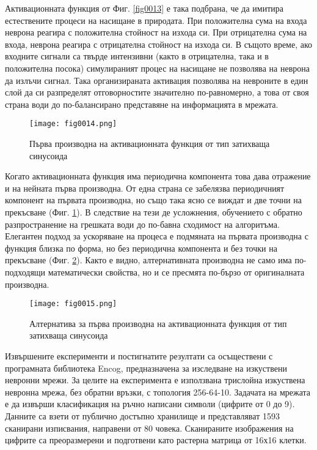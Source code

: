 Активационната функция от Фиг. \ref{fig0013} е така подбрана, че да имитира естествените процеси на насищане в природата. При положителна сума на входа неврона реагира с положителна стойност на изхода си. При отрицателна сума на входа, неврона реагира с отрицателна стойност на изхода си. В същото време, ако входните сигнали са твърде интензивни (както в отрицателна, така и в положителна посока) симулираният процес на насищане не позволява на неврона да излъчи сигнал. Така организираната активация позволява на невроните в един слой да си разпределят отговорностите значително по-равномерно, а това от своя страна води до по-балансирано представяне на информацията в мрежата.

\begin{figure}[H]
  \centering
  \texttt{[image: fig0014.png]}
  \caption{Първа производна на активационната функция от тип затихваща синусоида}
\label{fig0014}
\end{figure}

Когато активационната функция има периодична компонента това дава отражение и на нейната първа производна. От една страна се забелязва периодичният компонент на първата производна, но също така ясно се виждат и две точни на прекъсване (Фиг. \ref{fig0014}). В следствие на тези де усложнения, обучението с обратно разпространение на грешката води до по-бавна сходимост на алгоритъма. Елегантен подход за ускоряване на процеса е подмяната на първата производна с функция близка по форма, но без периодична компонента и без точки на прекъсване (Фиг. \ref{fig0015}). Както е видно, алтернативната производна не само има по-подходящи математически свойства, но и се пресмята по-бързо от оригиналната производна.

\begin{figure}[H]
  \centering
  \texttt{[image: fig0015.png]}
  \caption{Алтернатива за първа производна на активационната функция от тип затихваща синусоида}
\label{fig0015}
\end{figure}

Извършените експерименти и постигнатите резултати са осъществени с програмната библиотека Encog, предназначена за изследване на изкуствени невронни мрежи. За целите на експеримента е използвана трислойна изкуствена невронна мрежа, без обратни връзки, с топология 256-64-10. Задачата на мрежата е да извърши класификация на ръчно написани символи (цифрите от 0 до 9). Данните са взети от публично достъпно хранилище и представляват 1593 сканирани изписвания, направени от 80 човека. Сканираните изображения на цифрите са преоразмерени и подготвени като растерна матрица от 16х16 клетки.

